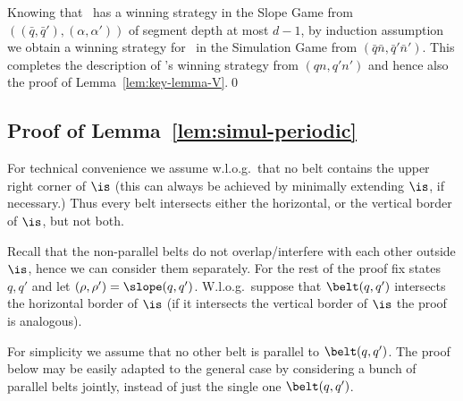 Knowing that \V\ has a winning strategy in the Slope Game from $((\bar q, \bar q'),
(\alpha,\alpha'))$ of segment depth at most $d-1$, by induction assumption we obtain 
a winning strategy for \V\ in the Simulation Game from $(\bar q \bar n, \bar q' \bar n')$. 
This completes the description of \V's winning strategy from $(q n, q' n')$ and hence also
the proof of Lemma~\ref{lem:key-lemma-V}.\qed



\subsection{Proof of Lemma~\ref{lem:simul-periodic}}\label{proof:lemma:x}
For technical convenience we assume w.l.o.g.~that no belt contains the upper right corner of $\is$
(this can always be achieved by minimally extending $\is$, if necessary.)
Thus every belt intersects either the horizontal, or the vertical border of $\is$, but not both.

Recall that the non-parallel belts do not overlap/interfere with each other outside $\is$, hence 
we can consider them separately. 
For the rest of the proof fix states $q, q'$ and let $(\rho, \rho') = \slope(q,q')$.
W.l.o.g.~suppose that $\belt(q,q')$ intersects the horizontal border of $\is$ 
(if it intersects the vertical border of $\is$ the proof is analogous).

For simplicity we assume that no other belt is parallel to $\belt(q,q')$.
The proof below may be easily adapted to the general case by considering a bunch of parallel belts
jointly, instead of just the single one $\belt(q,q')$.

